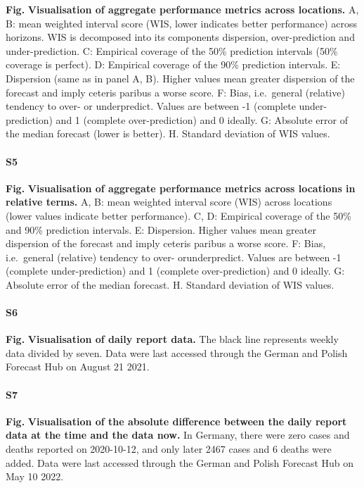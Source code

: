 \documentclass[10pt,letterpaper]{article}
\begin{document}
\textbf{Fig.} \label{fig:performance-locations}
\textbf{Visualisation of aggregate performance metrics across locations.}
A, B: mean weighted interval score (WIS, lower indicates better
performance) across horizons. WIS is decomposed into its components
dispersion, over-prediction and under-prediction. C: Empirical coverage
of the 50\% prediction intervals (50\% coverage is perfect). D:
Empirical coverage of the 90\% prediction intervals. E: Dispersion (same
as in panel A, B). Higher values mean greater dispersion of the forecast
and imply ceteris paribus a worse score. F: Bias, i.e.~general
(relative) tendency to over- or underpredict. Values are between -1
(complete under-prediction) and 1 (complete over-prediction) and 0
ideally. G: Absolute error of the median forecast (lower is better). H.
Standard deviation of WIS values.

\paragraph{S5}

\textbf{Fig.} \label{fig:performance-locations-rel}
\textbf{Visualisation of aggregate performance metrics across locations in relative terms.}
A, B: mean weighted interval score (WIS) across locations (lower values
indicate better performance). C, D: Empirical coverage of the 50\% and
90\% prediction intervals. E: Dispersion. Higher values mean greater
dispersion of the forecast and imply ceteris paribus a worse score. F:
Bias, i.e.~general (relative) tendency to over- orunderpredict. Values
are between -1 (complete under-prediction) and 1 (complete
over-prediction) and 0 ideally. G: Absolute error of the median
forecast. H. Standard deviation of WIS values.

\paragraph{S6}

\textbf{Fig.} \label{fig:daily-truth}
\textbf{Visualisation of daily report data.} The black line represents
weekly data divided by seven. Data were last accessed through the German
and Polish Forecast Hub on August 21 2021.

\paragraph{S7}

\textbf{Fig.} \label{fig:daily-truth-update}
\textbf{Visualisation of the absolute difference between the daily report data at the time and the data now.}
In Germany, there were zero cases and deaths reported on 2020-10-12, and
only later 2467 cases and 6 deaths were added. Data were last accessed
through the German and Polish Forecast Hub on May 10 2022.
\end{document}
